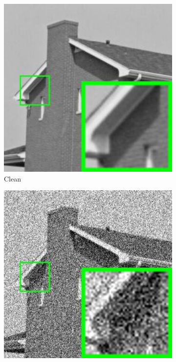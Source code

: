 \begin{figure}
    \centering
    \begin{subfigure}[t]{0.24\textwidth}
        \centering
        \includegraphics[width=1\textwidth]{images/pgpd/pgdpd/br_house.jpg}
	   \caption{Clean}
    \end{subfigure}
    \hfill
    \begin{subfigure}[t]{0.24\textwidth}
        \centering
        \includegraphics[width=1\textwidth]{images/pgpd/pgdpd/br_40_house.jpg}

\end{subfigure}
\end{figure}
